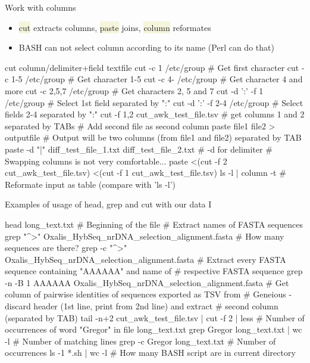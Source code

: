 \documentclass[compress, xelatex, 11pt, xcolor=svgnames, aspectratio=169,
	hyperref={
		bookmarks=true,
		unicode=true,
		colorlinks=true,
		pdftitle={Linux, command line and MetaCentrum},
		plainpages=false,
		pdfauthor={Vojtech Zeisek},
		pdfsubject={Course about use of Linux command line, writing shell scripts and using MetaCentrum of CESNET},
		pdfcreator={XeLaTeX},
		pdfkeywords={Linux, GNU, BASH, shell, command line, MetaCentrum},
		linkcolor=DarkRed, %
		anchorcolor=DarkBlue, %
		citecolor=Indigo, %
		filecolor=NavyBlue, %
		menucolor=DarkMagenta, %
		urlcolor=DarkBlue, %
		},
	url={hyphens, lowtilde} %
	]{beamer}
\renewcommand{\texttt}[1]{\colorbox{Beige}{{\ttfamily #1}}}
\begin{document}
\begin{frame}[fragile]{Work with columns}
	\label{cutpaste}
	\begin{itemize}
		\item \texttt{cut} extracts columns, \texttt{paste} joins, \texttt{column} reformates
		\item BASH can not select column according to its name (Perl can do that)
	\end{itemize}
	\vfill
	\begin{bashcode}
    cut column/delimiter+field textfile
    cut -c 1 /etc/group # Get first character
    cut -c 1-5 /etc/group # Get character 1-5
    cut -c 4- /etc/group # Get character 4 and more
    cut -c 2,5,7 /etc/group # Get characters 2, 5 and 7
    cut -d ':' -f 1 /etc/group # Select 1st field separated by ":"
    cut -d ':' -f 2-4 /etc/group # Select fields 2-4 separated by ":"
    cut -f 1,2 cut_awk_test_file.tsv # get columns 1 and 2 separated by TABs
    # Add second file as second column
    paste file1 file2 > outputfile
    # Output will be two columns (from file1 and file2) separated by TAB
    paste -d "|" diff_test_file_1.txt diff_test_file_2.txt # -d for delimiter
    # Swapping columns is not very comfortable...
    paste <(cut -f 2 cut_awk_test_file.tsv) <(cut -f 1 cut_awk_test_file.tsv)
    ls -l | column -t # Reformate input as table (compare with 'ls -l')
	\end{bashcode}
\end{frame}

\begin{frame}[fragile]{Examples of usage of head, grep and cut with our data I}
	\begin{bashcode}
    head long_text.txt # Beginning of the file
    # Extract names of FASTA sequences
    grep "^>" Oxalis_HybSeq_nrDNA_selection_alignment.fasta
    # How many sequences are there?
    grep -c "^>" Oxalis_HybSeq_nrDNA_selection_alignment.fasta
    # Extract every FASTA sequence containing "AAAAAA" and name of
    # respective FASTA sequence
    grep -n -B 1 AAAAAA Oxalis_HybSeq_nrDNA_selection_alignment.fasta
    # Get column of pairwise identities of sequences exported as TSV from
    # Geneious - discard header (1st line, print from 2nd line) and extract
    # second column (separated by TAB)
    tail -n+2 cut_awk_test_file.tsv | cut -f 2 | less
    # Number of occurrences of word "Gregor" in file long_text.txt
    grep Gregor long_text.txt | wc -l # Number of matching lines
    grep -c Gregor long_text.txt # Number of occurrences
    ls -1 *.sh | wc -l # How many BASH script are in current directory
	\end{bashcode}
\end{frame}
\end{document}
